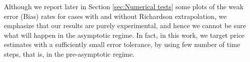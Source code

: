 \begin{remark}
	Although we report later in Section \ref{sec:Numerical tests} some plots of the weak error (Bias) rates for cases with and without Richardson extrapolation, we emphasize that our results are purely experimental, and hence we cannot be sure what will happen in the asymptotic regime. In fact, in this work, we target price estimates with a sufficiently small error tolerance, by using few number of time steps, that is, in the pre-asymptotic regime.
\end{remark}



